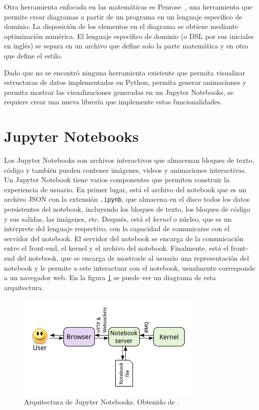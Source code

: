 Otra herramienta enfocada en las matemáticas es Penrose~\cite{Penrose}, una herramienta que permite crear diagramas a partir de un programa en un lenguaje específico de dominio. La disposición de los elementos en el diagrama se obtiene mediante optimización numérica. El lenguaje específico de dominio (o DSL por sus iniciales en inglés) se separa en un archivo que define solo la parte matemática y en otro que define el estilo.



Dado que no se encontró ninguna herramienta existente que permita visualizar estructuras de datos implementadas en Python, permita generar animaciones y permita mostrar las visualizaciones generadas en un Jupyter Notebooks, se requiere crear una nueva librería que implemente estas funcionalidades.

\section{Jupyter Notebooks}

Los Jupyter Notebooks son archivos interactivos que almacenan bloques de texto, código y también pueden contener imágenes, videos y animaciones interactivas. Un Jupyter Notebook tiene varios componentes que permiten construir la experiencia de usuario. En primer lugar, está el archivo del notebook que es un archivo JSON con la extensión \texttt{.ipynb}, que almacena en el disco todos los datos persistentes del notebook, incluyendo los bloques de texto, los bloques de código y sus salidas, las imágenes, etc. Después, está el \textit{kernel} o núcleo, que es un intérprete del lenguaje respectivo, con la capacidad de comunicarse con el servidor del notebook. El servidor del notebook se encarga de la comunicación entre el front-end, el kernel y el archivo del notebook. Finalmente, está el front-end del notebook, que se encarga de mostrarle al usuario una representación del notebook y le permite a este interactuar con el notebook, usualmente corresponde a un navegador web. En la figura \ref{fig:notebook_arq} se puede ver un diagrama de esta arquitectura.

\begin{figure}[h]
  \centering
  \includegraphics[width=0.8\textwidth]{imagenes/notebook/notebook_components}
  \caption[Arquitectura de Jupyter Notebooks]{Arquitectura de Jupyter Notebooks. Obtenido de \cite{arq-notebook}.}
  \label{fig:notebook_arq}
\end{figure}

